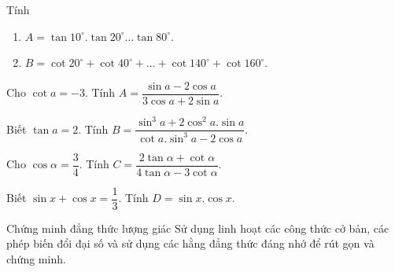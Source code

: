 \begin{bt}%
Tính
\begin{enumerate}[\indent a.]
	\item $A=\tan 10^{\circ}.\tan 20^{\circ}\dots\tan 80^{\circ}$.
	\item $B=\cot 20^{\circ}+\cot 40^{\circ}+\dots +\cot 140^{\circ}+\cot160^{\circ}$.
\end{enumerate}
\end{bt}
\begin{bt}%
Cho $\cot a=-3$. Tính $A=\dfrac{\sin a-2\cos a}{3\cos a+2\sin a}$.
\end{bt}
\begin{bt}%
Biết $\tan a=2$. Tính $B=\dfrac{\sin^3 a+2\cos^2 a.\sin a}{\cot a.\sin^3 a-2\cos a}$.
\end{bt}
\begin{bt}%
Cho $\cos \alpha=\dfrac{3}{4}$. Tính $C=\dfrac{2\tan \alpha+\cot \alpha}{4\tan \alpha-3\cot\alpha}$.
\end{bt}
\begin{bt}%
Biết $\sin x+\cos x=\dfrac{1}{3}$. Tính $D=\sin x.\cos x$.
\end{bt}

\begin{dang}{Chứng minh đẳng thức lượng giác}
Sử dụng linh hoạt các công thức cở bản, các phép biến đổi đại
số và sử dụng các hằng đẳng thức đáng nhớ để rút gọn và chứng minh.
\end{dang}

